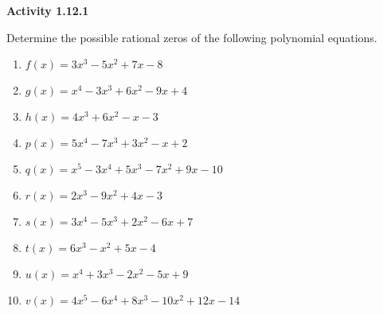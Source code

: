 \vspace{0.3ex}
\noindent\textbf{Activity 1.12.1}

\vspace{0.2ex}

Determine the possible rational zeros of the following polynomial equations.
\begin{enumerate}
    \item $ f(x) = 3x^3 - 5x^2 + 7x - 8 $
    \item $ g(x) = x^4 - 3x^3 + 6x^2 - 9x + 4 $
    \item $ h(x) = 4x^3 + 6x^2 - x - 3 $
    \item $ p(x) = 5x^4 - 7x^3 + 3x^2 - x + 2 $
    \item $ q(x) = x^5 - 3x^4 + 5x^3 - 7x^2 + 9x - 10 $
    \item $ r(x) = 2x^3 - 9x^2 + 4x - 3 $
    \item $ s(x) = 3x^4 - 5x^3 + 2x^2 - 6x + 7 $
    \item $ t(x) = 6x^3 - x^2 + 5x - 4 $
    \item $ u(x) = x^4 + 3x^3 - 2x^2 - 5x + 9 $
    \item $ v(x) = 4x^5 - 6x^4 + 8x^3 - 10x^2 + 12x - 14 $
\end{enumerate}
